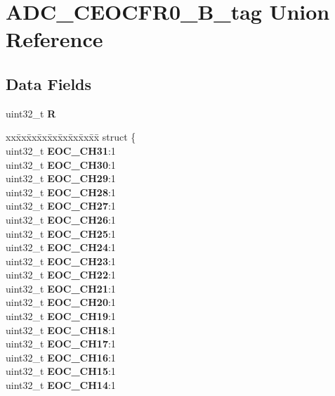 \hypertarget{unionADC__CEOCFR0__32B__tag}{}\section{A\+D\+C\+\_\+\+C\+E\+O\+C\+F\+R0\+\_\+B\+\_\+tag Union Reference}
\label{unionADC__CEOCFR0__32B__tag}
\subsection*{Data Fields}
\begin{DoxyCompactItemize}
\item 
\mbox{\label{unionADC__CEOCFR0__32B__tag_a32c2d9bb5e8e34a01c2d7951a9e78d73}} 
uint32\+\_\+t {\bfseries R}
\item 
\mbox{\label{unionADC__CEOCFR0__32B__tag_aff59888082b92a70fbf820e070638ee5}} 
\begin{tabbing}
xx\=xx\=xx\=xx\=xx\=xx\=xx\=xx\=xx\=\kill
struct \{\\
\>uint32\_t {\bfseries EOC\_CH31}:1\\
\>uint32\_t {\bfseries EOC\_CH30}:1\\
\>uint32\_t {\bfseries EOC\_CH29}:1\\
\>uint32\_t {\bfseries EOC\_CH28}:1\\
\>uint32\_t {\bfseries EOC\_CH27}:1\\
\>uint32\_t {\bfseries EOC\_CH26}:1\\
\>uint32\_t {\bfseries EOC\_CH25}:1\\
\>uint32\_t {\bfseries EOC\_CH24}:1\\
\>uint32\_t {\bfseries EOC\_CH23}:1\\
\>uint32\_t {\bfseries EOC\_CH22}:1\\
\>uint32\_t {\bfseries EOC\_CH21}:1\\
\>uint32\_t {\bfseries EOC\_CH20}:1\\
\>uint32\_t {\bfseries EOC\_CH19}:1\\
\>uint32\_t {\bfseries EOC\_CH18}:1\\
\>uint32\_t {\bfseries EOC\_CH17}:1\\
\>uint32\_t {\bfseries EOC\_CH16}:1\\
\>uint32\_t {\bfseries EOC\_CH15}:1\\
\>uint32\_t {\bfseries EOC\_CH14}:1\\

\end{tabbing}
\end{DoxyCompactItemize}
